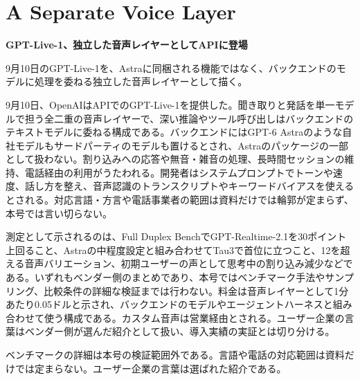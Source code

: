 \section{A Separate Voice Layer}
\begin{wideflow}
{\Large\bfseries GPT-Live-1、独立した音声レイヤーとしてAPIに登場}\par
\smallskip
{\color{SurveyMuted}9月10日のGPT-Live-1を、Astraに同梱される機能ではなく、バックエンドのモデルに処理を委ねる独立した音声レイヤーとして描く。}\par
\end{wideflow}

9月10日、OpenAIはAPIでのGPT-Live-1を提供した\cite{gptlive}。聞き取りと発話を単一モデルで担う全二重の音声レイヤーで、深い推論やツール呼び出しはバックエンドのテキストモデルに委ねる構成である。バックエンドにはGPT-6 Astraのような自社モデルもサードパーティのモデルも置けるとされ、Astraのパッケージの一部として扱わない。割り込みへの応答や無音・雑音の処理、長時間セッションの維持、電話経由の利用がうたわれる。開発者はシステムプロンプトでトーンや速度、話し方を整え、音声認識のトランスクリプトやキーワードバイアスを使えるとされる。対応言語・方言や電話事業者の範囲は資料だけでは輪郭が定まらず、本号では言い切らない。

測定として示されるのは、Full Duplex BenchでGPT-Realtime-2.1を30ポイント上回ること、Astraの中程度設定と組み合わせてTau3で首位に立つこと、12を超える音声バリエーション、初期ユーザーの声として思考中の割り込み減少などである\cite{gptlive}。いずれもベンダー側のまとめであり、本号ではベンチマーク手法やサンプリング、比較条件の詳細な検証までは行わない。料金は音声レイヤーとして1分あたり0.05ドルと示され、バックエンドのモデルやエージェントハーネスと組み合わせて使う構成である。カスタム音声は営業経由とされる。ユーザー企業の言葉はベンダー側が選んだ紹介として扱い、導入実績の実証とは切り分ける。

\begin{claimboundary}[音声レイヤーの境界]
ベンチマークの詳細は本号の検証範囲外である。言語や電話の対応範囲は資料だけでは定まらない。ユーザー企業の言葉は選ばれた紹介である。
\end{claimboundary}
